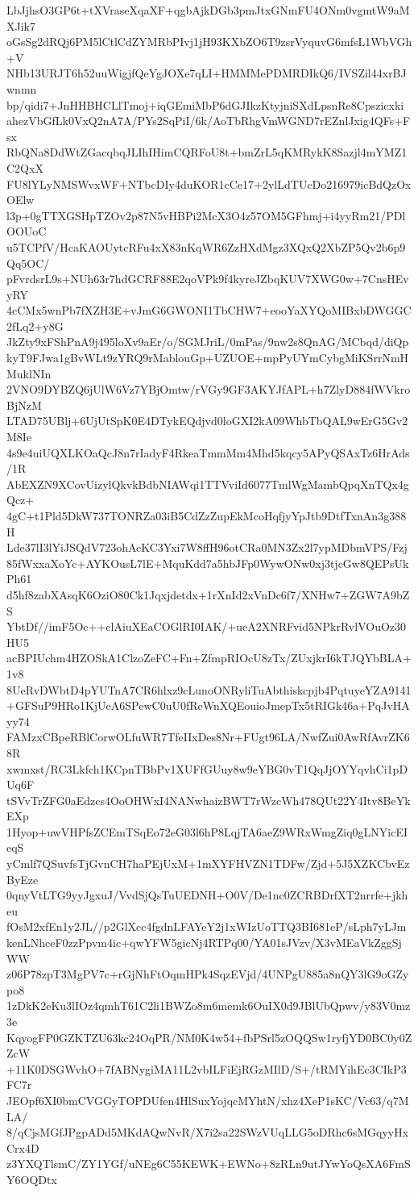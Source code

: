LbJjhsO3GP6t+tXVraseXqaXF+qgbAjkDGb3pmJtxGNmFU4ONm0vgmtW9aMXJik7
oGsSg2dRQj6PM5lCtlCdZYMRbPIvj1jH93KXbZO6T9zsrVyquvG6mfsL1WbVGh+V
NHb13URJT6h52uuWigjfQeYgJOXe7qLI+HMMMePDMRDIkQ6/IVSZil44xrBJwnmn
bp/qidi7+JnHHBHCLlTmoj+iqGEmiMbP6dGJIkzKtyjniSXdLpsnRe8Cpszicxki
ahezVbGfLk0VxQ2nA7A/PYs2SqPiI/6k/AoTbRhgVmWGND7rEZnlJxig4QFs+Fsx
RbQNa8DdWtZGacqbqJLIhIHimCQRFoU8t+bmZrL5qKMRykK8Sazjl4mYMZ1C2QxX
FU8lYLyNMSWvxWF+NTbcDIy4duKOR1cCe17+2ylLdTUcDo216979icBdQzOxOElw
l3p+0gTTXGSHpTZOv2p87N5vHBPi2McX3O4z57OM5GFhmj+i4yyRm21/PDlOOUoC
u5TCPfV/HcaKAOUytcRFu4xX83nKqWR6ZzHXdMgz3XQxQ2XbZP5Qv2b6p9Qq5OC/
pFvrdsrL9s+NUh63r7hdGCRF88E2qoVPk9f4kyreJZbqKUV7XWG0w+7CnsHEvyRY
4cCMx5wnPb7fXZH3E+vJmG6GWONI1TbCHW7+eooYaXYQoMIBxbDWGGC2fLq2+y8G
JkZty9xFShPnA9j495loXv9aEr/o/SGMJriL/0mPas/9nw2s8QnAG/MCbqd/diQp
kyT9FJwa1gBvWLt9zYRQ9rMablouGp+UZUOE+mpPyUYmCybgMiKSrrNmHMuklNIn
2VNO9DYBZQ6jUlW6Vz7YBjOmtw/rVGy9GF3AKYJfAPL+h7ZlyD884fWVkroBjNzM
LTAD75UBlj+6UjUtSpK0E4DTykEQdjvd0loGXI2kA09WhbTbQAL9wErG5Gv2M8Ie
4s9e4uiUQXLKOaQcJ8n7rIadyF4RkeaTmmMm4Mhd5kqcy5APyQSAxTz6HrAds/1R
AbEXZN9XCovUizylQkvkBdbNIAWqi1TTVviId6077TmlWgMambQpqXnTQx4gQcz+
4gC+t1Pld5DkW737TONRZa03iB5CdZzZupEkMcoHqfjyYpJtb9DtfTxnAn3g388H
Lde37lI3lYiJSQdV723ohAcKC3Yxi7W8ffH96otCRa0MN3Zx2l7ypMDbmVPS/Fzj
85fWxxaXoYc+AYKOusL7lE+MquKdd7a5hbJFp0WywONw0xj3tjcGw8QEPsUkPh61
d5hf8zabXAsqK6OziO80Ck1Jqxjdetdx+1rXnId2xVnDc6f7/XNHw7+ZGW7A9bZS
YbtDf//imF5Oc++clAiuXEaCOGlRI0IAK/+ueA2XNRFvid5NPkrRvlVOuOz30HU5
acBPIUchm4HZOSkA1ClzoZeFC+Fn+ZfmpRIOcU8zTx/ZUxjkrI6kTJQYbBLA+1v8
8UeRvDWbtD4pYUTnA7CR6hlxz9cLunoONRyliTuAbthiskcpjb4PqtuyeYZA9141
+GFSuP9HRo1KjUeA6SPewC0uU0fReWnXQEouioJmepTx5tRIGk46a+PqJvHAyy74
FAMzxCBpeRBlCorwOLfuWR7TfeIIxDes8Nr+FUgt96LA/NwfZui0AwRfAvrZK68R
xwmxst/RC3Lkfch1KCpnTBbPv1XUFfGUuy8w9eYBG0vT1QqJjOYYqvhCi1pDUq6F
tSVvTrZFG0aEdzcs4OoOHWxI4NANwhaizBWT7rWzcWh478QUt22Y4Itv8BeYkEXp
1Hyop+uwVHPfsZCEmTSqEo72eG03l6hP8LqjTA6aeZ9WRxWmgZiq0gLNYicEIeqS
yCmlf7QSuvfsTjGvnCH7haPEjUxM+1mXYFHVZN1TDFw/Zjd+5J5XZKCbvEzByEze
0qnyVtLTG9yyJgxuJ/VvdSjQsTuUEDNH+O0V/De1nc0ZCRBDrfXT2nrrfe+jkheu
fOsM2xfEn1y2JL//p2GlXcc4fgdnLFAYeY2j1xWIzUoTTQ3BI681eP/sLph7yLJm
kenLNhceF0zzPpvm4ic+qwYFW5gicNj4RTPq00/YA01sJVzv/X3vMEaVkZggSjWW
z06P78zpT3MgPV7c+rGjNhFtOqmHPk4SqzEVjd/4UNPgU885a8nQY3lG9oGZypo8
1zDkK2eKu3lIOz4qmhT61C2li1BWZo8m6memk6OuIX0d9JBlUbQpwv/y83V0mz3e
KqyogFP0GZKTZU63kc24OqPR/NM0K4w54+fbPSrl5zOQQSw1ryfjYD0BC0y0ZZcW
+11K0DSGWvhO+7fABNygiMA11L2vbILFiEjRGzMIlD/S+/tRMYihEc3CIkP3FC7r
JEOpf6XI0bmCVGGyTOPDUfen4HlSuxYojqcMYhtN/xhz4XeP1sKC/Vc63/q7MLA/
8/qCjsMGfJPgpADd5MKdAQwNvR/X7i2sa22SWzVUqLLG5oDRhc6sMGqyyHxCrx4D
z3YXQTlsmC/ZY1YGf/uNEg6C55KEWK+EWNo+8zRLn9utJYwYoQsXA6FmSY6OQDtx
